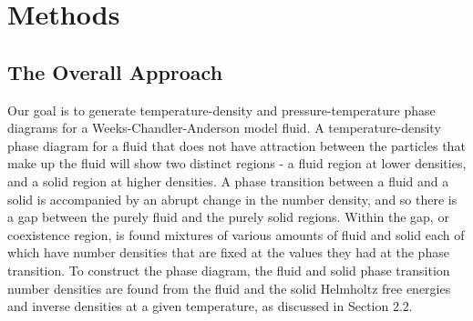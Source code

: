 \documentclass[double,12pt]{beavtex}
\begin{document}

\chapter{Methods}

\section{The Overall Approach}
  
Our goal is to generate temperature-density and pressure-temperature 
phase diagrams for a Weeks-Chandler-Anderson model fluid. 
A temperature-density phase diagram for a fluid that does not
have attraction between the particles that make up the fluid will show
two distinct regions - a fluid region at lower densities, and a solid 
region at higher densities. 
A phase transition between a fluid and a solid is accompanied by an 
abrupt change in the number density, and so there is a gap between the 
purely fluid and the purely solid regions. Within the gap, or coexistence
region, is found mixtures of various amounts of fluid and solid each of
which have number densities that are fixed at the values they had at the 
phase transition. 
To construct the phase diagram, the fluid and solid phase transition 
number densities are found 
from the fluid and the solid Helmholtz 
free energies and inverse densities at a given temperature, as
discussed in Section 2.2. 
\end{document}
